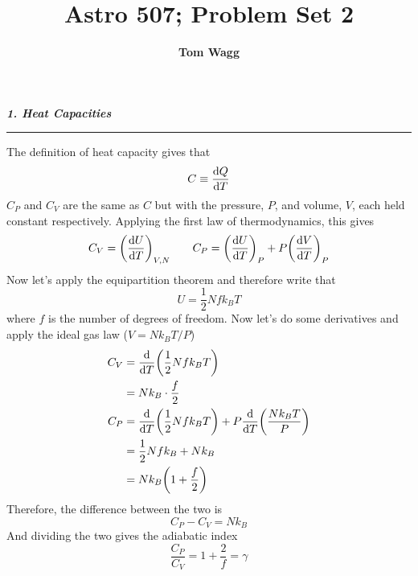 \documentclass[12pt, letterpaper, twoside]{article}
\title{Astro 507; Problem Set 2}
\author{\textbf{Tom Wagg}}
\newcommand{\question}[1]{{\noindent \it #1}}
\newcommand{\answer}[1]{
    \par\noindent\rule{\textwidth}{0.4pt}#1\vspace{0.5cm}
}
\begin{document}
\maketitle

\question{\textbf{1. Heat Capacities}}
\answer{
    The definition of heat capacity gives that
    \begin{equation}
        C \equiv \dv{Q}{T}
    \end{equation}
    $C_P$ and $C_V$ are the same as $C$ but with the pressure, $P$, and volume, $V$, each held constant respectively. Applying the first law of thermodynamics, this gives
    \begin{equation}
        C_V = \qty(\dv{U}{T})_{V, N}\qquad C_P = \qty(\dv{U}{T})_{P} + P \qty(\dv{V}{T})_{P}
    \end{equation}
    Now let's apply the equipartition theorem and therefore write that
    \begin{equation}
        U = \frac{1}{2} N f k_B T
    \end{equation}
    where $f$ is the number of degrees of freedom. Now let's do some derivatives and apply the ideal gas law ($V = N k_B T / P$)
    \begin{align}
        C_{V} &= \dv{T} \qty(\frac{1}{2} N f k_B T)\\
              &= N k_B \cdot \frac{f}{2} \\
        C_{P} &= \dv{T} \qty(\frac{1}{2} N f k_B T) + P \dv{T} \qty(\frac{N k_B T}{P})\\
              &= \frac{1}{2} N f k_B + N k_B \\
              &= N k_B \qty(1 + \frac{f}{2}) \\
    \end{align}
    Therefore, the difference between the two is
    \begin{equation}
        \boxed{ C_P - C_V = N k_B }
    \end{equation}
    And dividing the two gives the adiabatic index
    \begin{equation}
        \boxed{ \frac{C_P}{C_V} = 1 + \frac{2}{f} = \gamma }
    \end{equation}
}

\pagebreak
\end{document}
